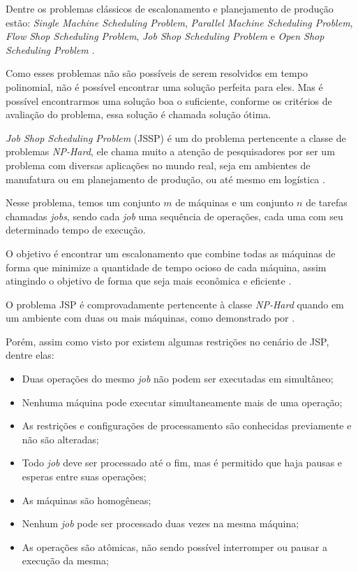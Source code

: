     Dentre os problemas clássicos de escalonamento e planejamento de produção estão: 
    \textit{Single Machine Scheduling Problem}, 
    \textit{Parallel Machine Scheduling Problem}, 
    \textit{Flow Shop Scheduling Problem}, 
    \textit{Job Shop Scheduling Problem} e 
    \textit{Open Shop Scheduling Problem} 
    \cite{Allahverdi2008}.\hfill\vspace{\onelineskip}

    Como esses problemas não são possíveis de serem resolvidos em tempo polinomial, não é possível encontrar uma solução perfeita para eles. Mas é possível encontrarmos uma solução boa o suficiente, conforme os critérios de avaliação do problema, essa solução é chamada solução ótima.\hfill\vspace{\onelineskip}

    \textit{Job Shop Scheduling Problem} (JSSP) é um do problema pertencente a classe de problemas \textit{NP-Hard}, ele chama muito a atenção de pesquisadores por ser um problema com diversas aplicações no mundo real, seja em ambientes de manufatura ou em planejamento de produção, ou até mesmo em logística \cite{Cheng1996}.\hfill\vspace{\onelineskip}

    Nesse problema, temos um conjunto $m$ de máquinas e um conjunto $n$ de tarefas chamadas \textit{jobs}, sendo cada \textit{job} uma sequência de operações, cada uma com seu determinado tempo de execução.\hfill\vspace{\onelineskip} 

    O objetivo é encontrar um escalonamento que combine todas as máquinas de forma que minimize a quantidade de tempo ocioso de cada máquina, assim atingindo o objetivo de forma que seja mais econômica e eficiente \cite{Cheng1996}.\hfill\vspace{\onelineskip}

    O problema JSP é comprovadamente pertencente à classe \textit{NP-Hard} quando em um ambiente com duas ou mais máquinas, como demonstrado por \cite{Lenstra1979}.\hfill\vspace{\onelineskip}

    Porém, assim como visto por \cite{Bagchi1999} existem algumas restrições no cenário de JSP, dentre elas:
    \begin{itemize}
        \item Duas operações do mesmo \textit{job} não podem ser executadas em simultâneo;
        \item Nenhuma máquina pode executar simultaneamente mais de uma operação;
        \item As restrições e configurações de processamento são conhecidas previamente e não são alteradas;
        \item Todo \textit{job} deve ser processado até o fim, mas é permitido que haja pausas e esperas entre suas operações;
        \item As máquinas são homogêneas;
        \item Nenhum \textit{job} pode ser processado duas vezes na mesma máquina;
        \item As operações são atômicas, não sendo possível interromper ou pausar a execução da mesma;
    \end{itemize}

